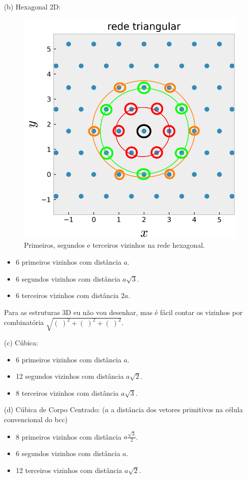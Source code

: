 \documentclass[a4paper,10pt]{article}
\begin{document}
(b) Hexagonal 2D:
\begin{figure}[H]
\centering
\includegraphics[width=0.3\linewidth]{fig/nn_triang}
\caption{Primeiros, segundos e terceiros vizinhos na rede hexagonal.}
\label{fig:nn_triang}
\end{figure}
\begin{itemize}
\item 6 primeiros vizinhos com distância $a$.
\item 6 segundos vizinhos com distância $a\sqrt{3}$.
\item 6 terceiros vizinhos com distância $2a$.
\end{itemize}

Para as estruturas 3D eu não vou desenhar, mas é fácil contar os vizinhos por combinatória $\sqrt{(\;)^2+(\;)^2+(\;)^2}$.

\n

(c) Cúbica:

\begin{itemize}
\item 6 primeiros vizinhos com distância $a$.
\item 12 segundos vizinhos com distância $a\sqrt{2}$.
\item 8 terceiros vizinhos com distância $a\sqrt{3}$.
\end{itemize}

(d) Cúbica de Corpo Centrado: ($a$ a distância dos vetores primitivos na célula convencional do bcc)

\begin{itemize}
\item 8 primeiros vizinhos com distância $a \frac{\sqrt{3}}{2}$.
\item 6 segundos vizinhos com distância $a$.
\item 12 terceiros vizinhos com distância $a\sqrt{2}$.
\end{itemize}
\end{document}
